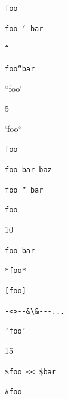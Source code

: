 
\def\mytitle{Code Spans}


\texttt{foo}

\texttt{foo ` bar}

\texttt{``}

\texttt{foo``bar}

``foo`

5

`foo``

\texttt{foo}

\texttt{foo   bar
  baz}

\texttt{foo `` bar}

\texttt{foo}

10

\texttt{foo   bar}

\texttt{*foo*}

\texttt{[foo]}

\texttt{-<>-{}-\&\textbackslash{}\&-{}-{}-...}

\texttt{`foo`}

15

\texttt{\$foo << \$bar}

\texttt{\#foo}


